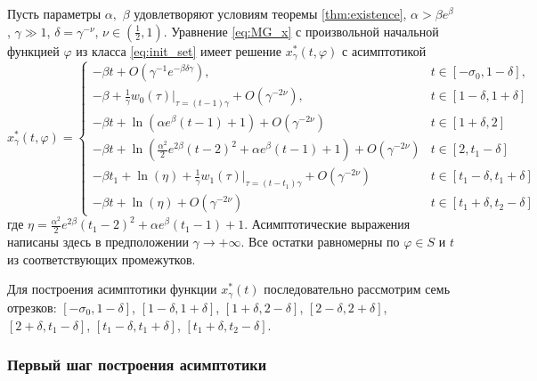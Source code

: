 \begin{theorem}
\label{thm:th_asymp}
Пусть параметры $\alpha,$ $\beta$ удовлетворяют условиям теоремы \ref{thm:existence}, $\alpha > \beta e^{\beta}$, $\gamma \gg 1$, $\delta = \gamma^{-\nu}$, $\nu \in (\frac{1}{2}, 1)$. Уравнение \eqref{eq:MG_x} с произвольной начальной функцией $\varphi$ из класса \eqref{eq:init_set} имеет решение $x_\gamma^*(t, \varphi)$ с асимптотикой
\footnotesize
\begin{equation}
	\label{eq:sol_x*gamma}
	x^*_\gamma(t, \varphi)= 
	\begin{cases}
		- \beta t + O(\gamma^{-1} e^{-\beta \delta \gamma}), & t\in[-\sigma_0, 1 - \delta],\\
		-\beta + \frac{1}{\gamma} w_0(\tau)|_{\tau=(t - 1)\gamma} + O(\gamma^{-2\nu}), & t \in [1 - \delta,1 + \delta]\\
		- \beta t + \ln(\alpha e^{\beta}(t - 1) + 1) + O(\gamma^{-2\nu}) & t\in[1 + \delta, 2]\\
		- \beta t + \ln(\frac{\alpha^2}{2}e^{2 \beta}(t - 2)^2 + \alpha e^{\beta}(t - 1) + 1) + O(\gamma^{-2\nu}) & t \in [2, t_1 - \delta]\\
		- \beta t_1 + \ln(\eta)+\frac{1}{\gamma} w_1(\tau)|_{\tau=(t - t_1)\gamma} + O(\gamma^{-2\nu}) & t\in[t_1 - \delta, t_1  +\delta]\\
		- \beta t + \ln(\eta) + O(\gamma^{-2\nu}) & t \in [t_1 + \delta, t_2 - \delta]
	\end{cases}
\end{equation}
\normalsize
где $\eta=\frac{\alpha^2}{2}e^{2\beta}(t_1 - 2)^2 + \alpha e^{\beta}(t_1 - 1) + 1$.
Асимптотические выражения написаны здесь в предположении $\gamma\to+\infty$.
Все остатки равномерны по $\varphi \in S$ и $t$ из соответствующих промежутков.
\end{theorem}

Для построения асимптотики функции $x_\gamma^*(t)$ последовательно рассмотрим семь отрезков:
$[-\sigma_0, 1 - \delta]$, 
$[1  -\delta, 1 + \delta]$,
$[1 + \delta, 2 - \delta]$,
$[2 - \delta, 2 + \delta]$,
$[2 + \delta, t_1 - \delta]$,
$[t_1 - \delta, t_1 + \delta]$,
$[t_1 + \delta, t_2 - \delta]$.

\subsubsection{Первый шаг построения асимптотики}

